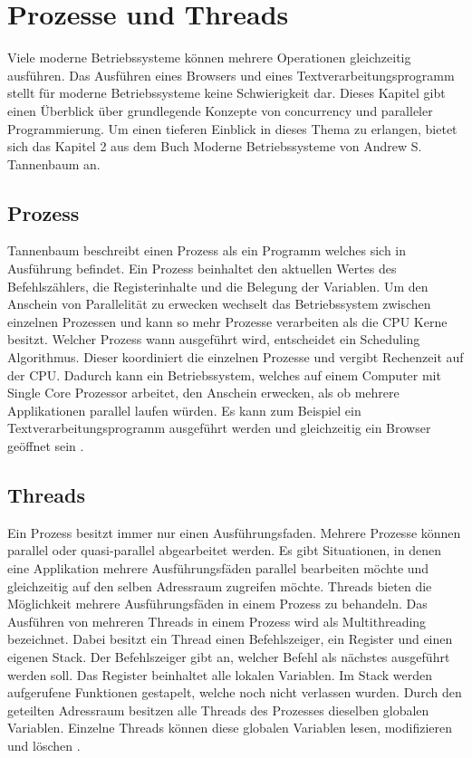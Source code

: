 \section{Prozesse und Threads}

Viele moderne Betriebssysteme können mehrere Operationen gleichzeitig ausführen. Das Ausführen eines Browsers und eines Textverarbeitungsprogramm stellt für moderne Betriebssysteme keine Schwierigkeit dar. Dieses Kapitel gibt einen Überblick über grundlegende Konzepte von concurrency und paralleler Programmierung. Um einen tieferen Einblick in dieses Thema zu erlangen, bietet sich das Kapitel 2 aus dem Buch Moderne Betriebssysteme von Andrew S. Tannenbaum an. 

\subsection{Prozess}
\label{section: Prozess}
Tannenbaum beschreibt einen Prozess als ein Programm welches sich in Ausführung befindet. Ein Prozess beinhaltet den aktuellen Wertes des Befehlszählers, die Registerinhalte und die Belegung der Variablen. Um den Anschein von Parallelität zu erwecken wechselt das Betriebssystem zwischen einzelnen Prozessen und kann so mehr Prozesse verarbeiten als die CPU Kerne besitzt. Welcher Prozess wann ausgeführt wird, entscheidet ein Scheduling Algorithmus. Dieser koordiniert die einzelnen Prozesse und vergibt Rechenzeit auf der CPU. Dadurch kann ein Betriebssystem, welches auf einem Computer mit Single Core Prozessor arbeitet, den Anschein erwecken, als ob mehrere Applikationen parallel laufen würden. Es kann zum Beispiel ein Textverarbeitungsprogramm ausgeführt werden und gleichzeitig ein Browser geöffnet sein \cite[p. 87]{tan09}.

\subsection{Threads}
\label{section: Threads}
Ein Prozess besitzt immer nur einen Ausführungsfaden. Mehrere Prozesse können parallel oder quasi-parallel abgearbeitet werden. Es gibt Situationen, in denen eine Applikation mehrere Ausführungsfäden parallel bearbeiten möchte und gleichzeitig auf den selben Adressraum zugreifen möchte. Threads bieten die Möglichkeit mehrere Ausführungsfäden in einem Prozess zu behandeln. Das Ausführen von mehreren Threads in einem Prozess wird als Multithreading bezeichnet. Dabei besitzt ein Thread einen Befehlszeiger, ein Register und einen eigenen Stack. Der Befehlszeiger gibt an, welcher Befehl als nächstes ausgeführt werden soll. Das Register beinhaltet alle lokalen Variablen. Im Stack werden aufgerufene Funktionen gestapelt, welche noch nicht verlassen wurden. Durch den geteilten Adressraum besitzen alle Threads des Prozesses dieselben globalen Variablen. Einzelne Threads können diese globalen Variablen lesen, modifizieren und löschen \cite[p. 97]{tan09}. 

